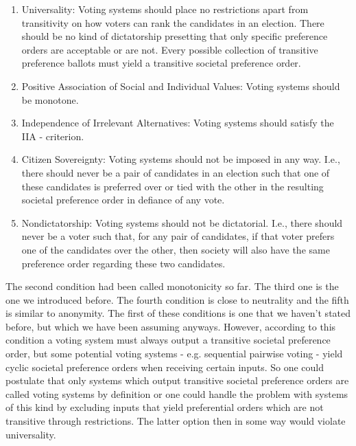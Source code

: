 \begin{enumerate} %
\item Universality: Voting systems should place no restrictions apart from transitivity on how voters can rank the candidates in an election. There should be no kind of dictatorship presetting that only specific preference orders are acceptable or are not. Every possible collection of transitive preference ballots must yield a transitive societal preference order. 
\item Positive Association of Social and Individual Values: Voting systems should be monotone. 
\item Independence of Irrelevant Alternatives: Voting systems should satisfy the IIA - criterion. 
\item Citizen Sovereignty: Voting systems should not be imposed in any way. I.e., there should never be a pair of candidates in an election such that one of these candidates is preferred over or tied with the other in the resulting societal preference order in defiance of any vote. 
\item Nondictatorship: Voting systems should not be dictatorial. I.e., there should never be a voter such that, for any pair of candidates, if that voter prefers one of the candidates over the other, then society will also have the same preference order regarding these two candidates. 
\end{enumerate} 
The second condition had been called monotonicity so far. The third one is the one we introduced before. The fourth condition is close to neutrality and the fifth is similar to anonymity. 
The first of these conditions is one that we haven't stated before, but which we have been assuming anyways. However, according to this condition a voting system must always output a transitive societal preference order, but some potential voting systems - e.g. sequential pairwise voting - yield cyclic societal preference orders when receiving certain inputs. So one could postulate that only systems which output transitive societal preference orders are called voting systems by definition or one could handle the problem with systems of this kind by excluding inputs that yield preferential orders which are not transitive through restrictions. The latter option then in some way would violate universality. \\
